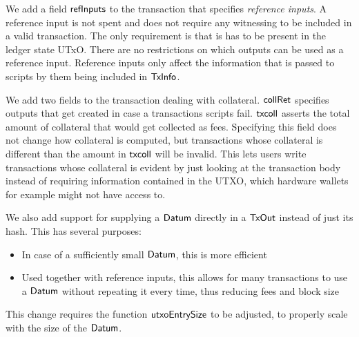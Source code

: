 We add a field $\mathsf{refInputs}$ to the transaction that specifies
\emph{reference inputs}. A reference input is not spent and does not
require any witnessing to be included in a valid transaction. The only
requirement is that is has to be present in the ledger state
UTxO. There are no restrictions on which outputs can be used as a
reference input. Reference inputs only affect the information that is
passed to scripts by them being included in $\mathsf{TxInfo}$. 

We add two fields to the transaction dealing with
collateral. $\mathsf{collRet}$ specifies outputs that get created in case
a transactions scripts fail. $\mathsf{txcoll}$ asserts the total amount
of collateral that would get collected as fees. Specifying this field
does not change how collateral is computed, but transactions whose
collateral is different than the amount in $\mathsf{txcoll}$ will be
invalid. This lets users write transactions whose collateral is
evident by just looking at the transaction body instead of requiring
information contained in the UTXO, which hardware wallets for example
might not have access to.

We also add support for supplying a $\mathsf{Datum}$ directly in a $\mathsf{TxOut}$
instead of just its hash. This has several purposes:
\begin{itemize}
\item In case of a sufficiently small $\mathsf{Datum}$, this is more efficient
\item Used together with reference inputs, this allows for many
  transactions to use a $\mathsf{Datum}$ without repeating it every time, thus
  reducing fees and block size
\end{itemize}
This change requires the function $\mathsf{utxoEntrySize}$ to be
adjusted, to properly scale with the size of the $\mathsf{Datum}$. 
